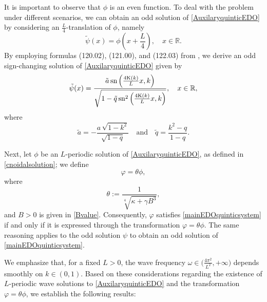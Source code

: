 \documentclass[10pt,reqno,a4paper]{amsart} %
\theoremstyle{definition} %
\numberwithin{equation}{section}
\numberwithin{figure}{section}
\begin{document}
It is important to observe that $\phi$ is an even function. To deal with the problem under different scenarios, we can obtain an odd solution of \eqref{AuxilaryquinticEDO} by considering an $\frac{L}{4}$-translation of $\phi$, namely 
$$
\tilde{\psi}(x) = \phi \left(x+\frac{L}{4}\right), \quad x \in \mathbb{R}.
$$ By employing formulas (120.02), (121.00), and (122.03) from \cite{byrd}, we derive an odd sign-changing solution of \eqref{AuxilaryquinticEDO} given by
\begin{equation}\label{cnoidal-solution-odd}
	\tilde{\psi}(x) = \frac{\tilde{a} \, \text{sn} \left( \frac{4{\rm K}(k)}{L} x, k \right)}{\sqrt{1 - \tilde{q} \, \text{sn}^2 \left( \frac{4{\rm K}(k)}{L} x, k \right)}}, \quad x \in \mathbb{R},
\end{equation}
where %
\begin{equation}\label{tildea-tildeq}
	\tilde{a} = - \frac{a \, \sqrt{1-k^2}}{\sqrt{1-q}} \quad \text{and} \quad \tilde{q} = \frac{k^2 - q}{1-q}.
\end{equation}

Next, let $\phi$ be an $L$-periodic solution of \eqref{AuxilaryquinticEDO}, as defined in \eqref{cnoidalsolution}; we define \begin{equation}\label{transformation-solution}
	\varphi=\theta \phi,
\end{equation}
 where
\begin{equation}\label{theta}
	\theta:=\frac{1}{\sqrt[4]{\kappa+\gamma B^3}},
\end{equation}
and $B>0$ is given in \eqref{Bvalue}. Consequently, $\varphi$ satisfies \eqref{mainEDOquinticsystem} if and only if it is expressed through the transformation $\varphi = \theta \phi$. The same reasoning applies to the odd solution $\psi$ to obtain an odd solution of \eqref{mainEDOquinticsystem}.

We emphasize that, for a fixed $L>0$,  the wave frequency $\omega \in \big( \tfrac{4\pi^2}{L^2}, +\infty \big)$ depends smoothly on $k \in (0,1)$. Based on these considerations regarding the existence of $L$-periodic wave solutions to \eqref{AuxilaryquinticEDO} and the transformation $\varphi = \theta \phi$, we establish the following results:
\end{document}
